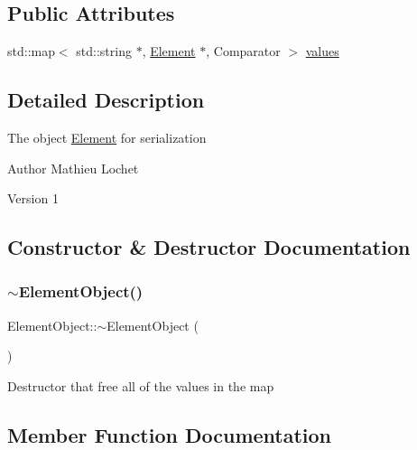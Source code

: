 \subsection*{Public Attributes}
\begin{DoxyCompactItemize}
\item 
std\+::map$<$ std\+::string $\ast$, \mbox{\hyperlink{classElement}{Element}} $\ast$, Comparator $>$ \mbox{\hyperlink{classElementObject_afd42a22449d05bcaaf3a194ecb2b4b4c}{values}}
\end{DoxyCompactItemize}


\subsection{Detailed Description}
The object \mbox{\hyperlink{classElement}{Element}} for serialization

\begin{DoxyAuthor}{Author}
Mathieu Lochet 
\end{DoxyAuthor}
\begin{DoxyVersion}{Version}
1 
\end{DoxyVersion}


\subsection{Constructor \& Destructor Documentation}
\mbox{\label{classElementObject_a4bec4155f2f99e6ec30e3d44a4d84fa4}} 
\subsubsection{\texorpdfstring{$\sim$\+Element\+Object()}{~ElementObject()}}
{\footnotesize\ttfamily Element\+Object\+::$\sim$\+Element\+Object (\begin{DoxyParamCaption}{ }\end{DoxyParamCaption})\hspace{0.3cm}{\ttfamily [override]}}

Destructor that free all of the values in the map 

\subsection{Member Function Documentation}
\mbox{\label{classElementObject_a7b3a1ef505e63d87ad39309c5ae1b5b3}} 
